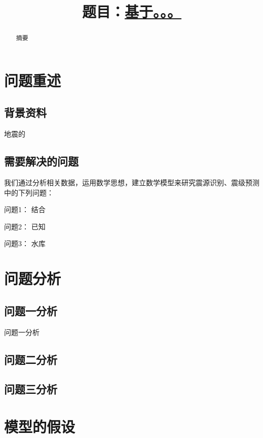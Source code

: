 \documentclass[withoutpreface,bwprint]{cumcmthesis} %
\title{题\quad 目：\underline{\quad\quad 基于。。。 \quad\quad}}
\begin{document}
\maketitle
\begin{abstract}
	摘要

\end{abstract}


\section{问题重述}

\subsection{背景资料}

地震的

\subsection{需要解决的问题}

我们通过分析相关数据，运用数学思想，建立数学模型来研究震源识别、震级预测中的下列问题：

问题1： 结合

问题2： 已知

问题3： 水库

\section{问题分析}

\subsection{问题一分析}

问题一分析


\subsection{问题二分析}


\subsection{问题三分析}


\section{模型的假设}
\end{document}
